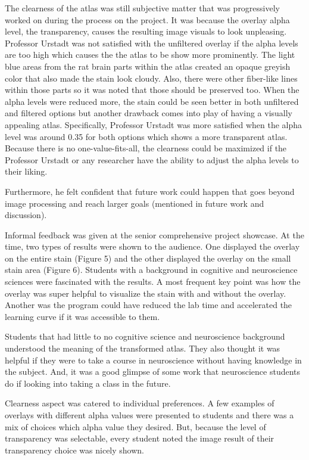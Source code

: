 \documentclass[10pt,twocolumn]{article}
\begin{document}
The clearness of the atlas was still subjective matter that was progressively worked on during the process on the project. It was because the overlay alpha level, the transparency, causes the resulting image visuals to look unpleasing. Professor Urstadt was not satisfied with the unfiltered overlay if the alpha levels are too high which causes the the atlas to be show more prominently. The light blue areas from the rat brain parts within the atlas created an opaque greyish color that also made the stain look cloudy. Also, there were other fiber-like lines within those parts so it was noted that those should be preserved too. When the alpha levels were reduced more, the stain could be seen better in both unfiltered and filtered options but another drawback comes into play of having a visually appealing atlas. Specifically, Professor Urstadt was more satisfied when the alpha level was around 0.35 for both options which shows a more transparent atlas. Because there is no one-value-fits-all, the clearness could be maximized if the Professor Urstadt or any researcher have the ability to adjust the alpha levels to their liking.

Furthermore, he felt confident that future work could happen that goes beyond image processing and reach larger goals (mentioned in future work and discussion).
 
 Informal feedback was given at the senior comprehensive project showcase. At the time, two types of results were shown to the audience. One displayed the overlay on the entire stain (Figure 5) and the other displayed the overlay on the small stain area (Figure 6). Students with a background in cognitive and neuroscience sciences were fascinated with the results. A most frequent key point was how the overlay was super helpful to visualize the stain with and without the overlay. Another was the program could have reduced the lab time and accelerated the learning curve if it was accessible to them. 
 
 Students that had little to no cognitive science and neuroscience background understood the meaning of the transformed atlas. They also thought it was helpful if they were to take a course in neuroscience without having knowledge in the subject. And, it was a good glimpse of some work that neuroscience students do if looking into taking a class in the future. 

 Clearness aspect was catered to individual preferences. A few examples of overlays with different alpha values were presented to students and there was a mix of choices which alpha value they desired. But, because the level of transparency was selectable, every student noted the image result of their transparency choice was nicely shown. 
\end{document}
